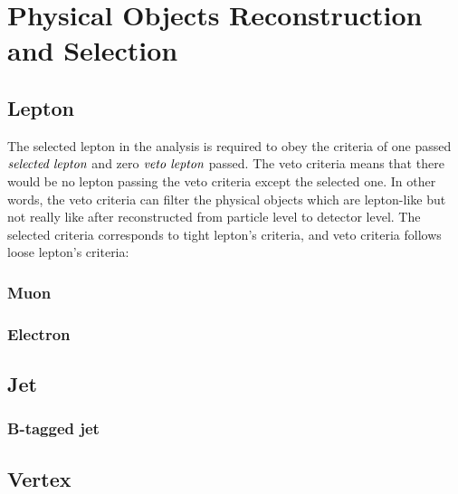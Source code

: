 

\section{Physical Objects Reconstruction and Selection}
\label{sec:PhysObj}

	\subsection{Lepton}
	\label{ssec:PhysObj_lep}

		The selected lepton in the analysis is required to obey the criteria of one passed $\emph{selected lepton}$ and zero $\emph{veto lepton}$ passed. The veto criteria means that there would be no lepton passing the veto criteria except the selected one. In other words, the veto criteria can filter the physical objects which are lepton-like but not really like after reconstructed from particle level to detector level. The selected criteria corresponds to tight lepton's criteria, and veto criteria follows loose lepton's criteria:

		\subsubsection{Muon}
		\label{sssec:Muon}
			

		\subsubsection{Electron}
		\label{sssec:Electron}

	\subsection{Jet}
	\label{ssec:PhysObj_jet}

		\subsubsection{B-tagged jet}
		\label{sssec:bjet}


	\subsection{Vertex}
	\label{ssec:PhysObj_vertex}


\FloatBarrier
